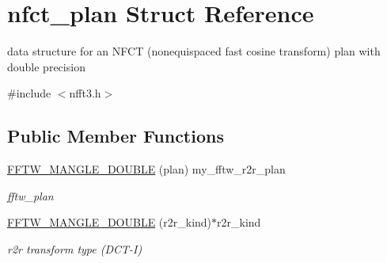 \hypertarget{structnfct__plan}{\section{nfct\-\_\-plan Struct Reference}
\label{structnfct__plan}
}


data structure for an N\-F\-C\-T (nonequispaced fast cosine transform) plan with double precision  




{\ttfamily \#include $<$nfft3.\-h$>$}

\subsection*{Public Member Functions}
\begin{DoxyCompactItemize}
\item 
\hypertarget{structnfct__plan_af736d9e6e59e9a91276a48a50979fedb}{\hyperlink{structnfct__plan_af736d9e6e59e9a91276a48a50979fedb}{F\-F\-T\-W\-\_\-\-M\-A\-N\-G\-L\-E\-\_\-\-D\-O\-U\-B\-L\-E} (plan) my\-\_\-fftw\-\_\-r2r\-\_\-plan}\label{structnfct__plan_af736d9e6e59e9a91276a48a50979fedb}

\begin{DoxyCompactList}\small\item\em fftw\-\_\-plan \end{DoxyCompactList}\item 
\hypertarget{structnfct__plan_a5ae19fdb6ea93d515109229f419c22df}{\hyperlink{structnfct__plan_a5ae19fdb6ea93d515109229f419c22df}{F\-F\-T\-W\-\_\-\-M\-A\-N\-G\-L\-E\-\_\-\-D\-O\-U\-B\-L\-E} (r2r\-\_\-kind)$\ast$r2r\-\_\-kind}\label{structnfct__plan_a5ae19fdb6ea93d515109229f419c22df}

\begin{DoxyCompactList}\small\item\em r2r transform type (D\-C\-T-\/\-I) \end{DoxyCompactList}\end{DoxyCompactItemize}
